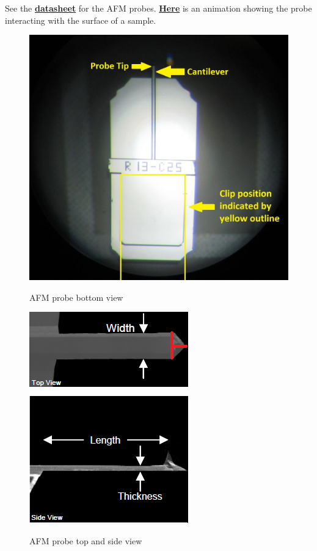 \documentclass{../lab}
\begin{document}
See the \href{http://experimentationlab.berkeley.edu/sites/default/files/AFMImages/ACLA\_4\_datasheet.pdf}{\textbf{datasheet}} for the AFM probes. \href{http://experimentationlab.berkeley.edu/sites/default/files/AFMImages/1.1.\%20Generating\%20an\%20image.flv\_converted.mp4}{\textbf{Here}} is an animation showing the probe interacting with the surface of a sample.

\begin{figure}[H]
\centering
  \href{http://experimentationlab.berkeley.edu/sites/default/files/AFMImages/AFMprobe.JPG}{\includegraphics[height=230\px,keepaspectratio]{images/AFMprobe.JPG}}
  \caption{AFM probe bottom view}
  \label{fig:AFMProbe}
\endminipage\hfill
{}
\centering
  \href{http://experimentationlab.berkeley.edu/sites/default/files/AFMImages/26.png}{\includegraphics[height=230\px,keepaspectratio]{images/26.png}}
  \caption{AFM probe top and side view}
  \label{fig:AFMProbe2}
\endminipage
\end{figure}
\end{document}
